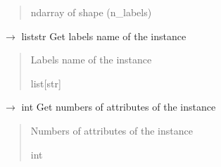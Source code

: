 \documentclass[letterpaper,10pt,english]{sphinxmanual}
\begin{document}
\begin{fulllineitems}
\begin{fulllineitems}
\begin{quote}
\begin{description}
\sphinxAtStartPar
ndarray of shape (n\_labels)

\end{description}\end{quote}

\end{fulllineitems}


\begin{fulllineitems}
\label{\detokenize{data/_autosummary/miml.data.instance.Instance:miml.data.instance.Instance.get_labels_name}}
\pysigstartsignatures
\pysiglinewithargsret
{}
{}
{{ $\rightarrow$ list\DUrole{p}{{[}}str\DUrole{p}{{]}}}}
\pysigstopsignatures
\sphinxAtStartPar
Get labels name of the instance
\begin{quote}\begin{description}
\sphinxAtStartPar
{} \textendash{} Labels name of the instance

\sphinxAtStartPar
list{[}str{]}

\end{description}\end{quote}

\end{fulllineitems}


\begin{fulllineitems}
\label{\detokenize{data/_autosummary/miml.data.instance.Instance:miml.data.instance.Instance.get_number_attributes}}
\pysigstartsignatures
\pysiglinewithargsret
{}
{}
{{ $\rightarrow$ int}}
\pysigstopsignatures
\sphinxAtStartPar
Get numbers of attributes of the instance
\begin{quote}\begin{description}
\sphinxAtStartPar
{} \textendash{} Numbers of attributes of the instance

\sphinxAtStartPar
int

\end{description}\end{quote}


\end{fulllineitems}
\end{fulllineitems}
\end{document}
